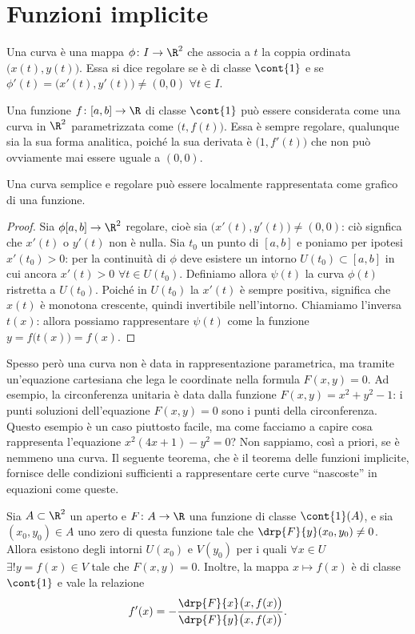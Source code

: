 \chapter{Funzioni implicite}
\begin{definizione}
	Una curva è una mappa $\phi\colon I\to\R^2$ che associa a $t$ la coppia ordinata $\big(x(t),y(t)\big)$. Essa si dice regolare se è di classe $\cont{1}$ e se $\phi'(t)=\big(x'(t),y'(t)\big)\neq(0,0)$ $\forall t\in I$.
\end{definizione}
Una funzione $f\colon[a,b]\to\R$ di classe $\cont{1}$ può essere considerata come una curva in $\R^2$ parametrizzata come $\big(t,f(t)\big)$. Essa è sempre regolare, qualunque sia la sua forma analitica, poiché la sua derivata è $\big(1,f'(t)\big)$ che non può ovviamente mai essere uguale a $(0,0)$.
\begin{osservazione}
	Una curva semplice e regolare può essere localmente rappresentata come grafico di una funzione.
\end{osservazione}
\begin{proof}
	Sia $\phi[a,b]\to\R^2$ regolare, cioè sia $\big(x'(t),y'(t)\big)\neq(0,0)$: ciò signfica che $x'(t)$ o $y'(t)$ non è nulla.
	Sia $t_0$ un punto di $[a,b]$ e poniamo per ipotesi $x'(t_0)>0$: per la continuità di $\phi$ deve esistere un intorno $U(t_0)\subset[a,b]$ in cui ancora $x'(t)>0$ $\forall t\in U(t_0)$.
	Definiamo allora $\psi(t)$ la curva $\phi(t)$ ristretta a $U(t_0)$. Poiché in $U(t_0)$ la $x'(t)$ è sempre positiva, significa che $x(t)$ è monotona crescente, quindi invertibile nell'intorno. Chiamiamo l'inversa $t(x)$: allora possiamo rappresentare $\psi(t)$ come la funzione $y=f\big(t(x)\big)=f(x)$.
	\end{proof}
Spesso però una curva non è data in rappresentazione parametrica, ma tramite un'equazione cartesiana che lega le coordinate nella formula $F(x,y)=0$. Ad esempio, la circonferenza unitaria è data dalla funzione $F(x,y)=x^2+y^2-1$: i punti soluzioni dell'equazione $F(x,y)=0$ sono i punti della circonferenza.
Questo esempio è un caso piuttosto facile, ma come facciamo a capire cosa rappresenta l'equazione $x^2(4x+1)-y^2=0$? Non sappiamo, così a priori, se è nemmeno una curva. Il seguente teorema, che è il teorema delle funzioni implicite, fornisce delle condizioni sufficienti a rappresentare certe curve ``nascoste'' in equazioni come queste.
\begin{teorema}[di Dini] \label{t:dini-R2}
	Sia $A\subset\R^2$ un aperto e $F\colon A\to\R$ una funzione di classe $\cont{1}(A)$, e sia $(x_0,y_0)\in A$ uno zero di questa funzione tale che $\drp{F}{y}(x_0,y_0)\neq 0$.
	Allora esistono degli intorni $U(x_0)$ e $V(y_0)$ per i quali $\forall x\in U$ $\exists! y=f(x)\in V$ tale che $F(x,y)=0$. Inoltre, la mappa $x\mapsto f(x)$ è di classe $\cont{1}$ e vale la relazione
	\begin{equation}
		f'(x)=-\dfrac{\drp{F}{x}\big(x,f(x)\big)}{\drp{F}{y}\big(x,f(x)\big)}.
		\label{eq:dini-R2}
	\end{equation}
\end{teorema}
